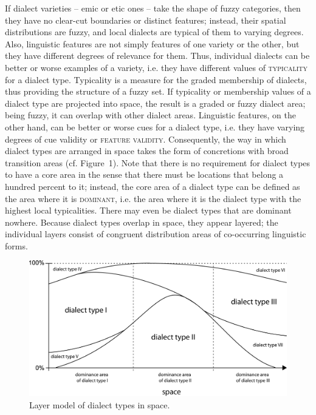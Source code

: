 \documentclass[output=paper]{LSP/langsci}
\begin{document}
If dialect varieties – emic or etic ones – take the shape of fuzzy categories, then they have no clear-cut boundaries or distinct features; instead, their spatial distributions are fuzzy, and local dialects are typical of them to varying degrees. Also, linguistic features are not simply features of one variety or the other, but they have different degrees of relevance for them. Thus, individual dialects can be better or worse examples of a variety, i.e. they have different values of \textsc{typicality} for a dialect type. Typicality is a measure for the graded membership of dialects, thus providing the structure of a fuzzy set. If typicality or membership values of a dialect type are projected into space, the result is a graded or fuzzy dialect area; being fuzzy, it can overlap with other dialect areas. Linguistic features, on the other hand, can be better or worse cues for a dialect type, i.e. they have varying degrees of cue validity or \textsc{feature validity}. Consequently, the way in which dialect types are arranged in space takes the form of concretions with broad transition areas (cf. Figure~1). Note that there is no requirement for dialect types to have a core area in the sense that there must be locations that belong a hundred percent to it; instead, the core area of a dialect type can be defined as the area where it is \textsc{dominant}, i.e. the area where it is the dialect type with the highest local typicalities. There may even be dialect types that are dominant nowhere. Because dialect types overlap in space, they appear layered; the individual layers consist of congruent distribution areas of co-occurring linguistic forms.

\begin{figure}
\includegraphics[width=\textwidth]{illustrations/pickl_fig1}
\caption{Layer model of dialect types in space.}
\label{fig:1}
\end{figure}
\end{document}
